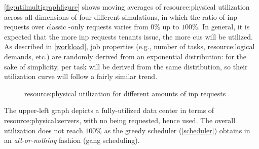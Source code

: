 \autoref{fig:utilmultigraphfigure} shows moving averages of \gls{resource:physical} utilization across all dimensions of four different simulations, in which the ratio of \gls{inp} requests over classic -only requests varies from $0\%$ up to $100\%$.
In general, it is expected that the more \gls{inp} requests tenants issue, the more \glspl{cu} will be utilized.
As described in \autoref{workload}, job properties (e.g., number of tasks, \gls{resource:logical} demands, etc.) are randomly derived from an exponential distribution:
for the sake of simplicity,  per task will be derived from the same distribution, so their utilization curve will follow a fairly similar trend.

\begin{figure}[!htb]
    \centering
    \usebox{\utilmultigraphfigure}
    \caption{\Gls{resource:physical} utilization for different amounts of \gls{inp} requests}
    \label{fig:utilmultigraphfigure}
\end{figure}

The upper-left graph depicts a fully-utilized data center in terms of \glspl{resource:physical:server}, with no  being requested, hence used.
The overall  utilization does not reach $100\%$ as the greedy scheduler (\autoref{scheduler}) obtains  in an \textit{all-or-nothing} fashion (gang scheduling).

